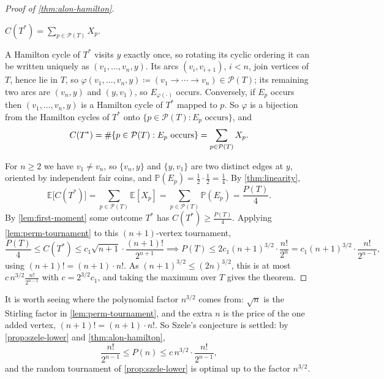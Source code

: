\begin{proof}[Proof of \autoref{thm:alon-hamilton}]
    \begin{claim}
        \(C(T^*) = \sum_{p \in \mathcal{P}(T)} X_p\).
    \end{claim}
    \begin{subproof}
        A Hamilton cycle of \(T^*\) visits \(y\) exactly once, so rotating its cyclic ordering it can be written uniquely as \((v_1, \ldots, v_n, y)\). Its arcs \((v_i, v_{i+1})\), \(i < n\), join vertices of \(T\), hence lie in \(T\), so \(\varphi(v_1, \ldots, v_n, y) \coloneqq (v_1 \to \cdots \to v_n) \in \mathcal{P}(T)\); its remaining two arcs are \((v_n, y)\) and \((y, v_1)\), so \(E_{\varphi(\cdot)}\) occurs. Conversely, if \(E_p\) occurs then \((v_1, \ldots, v_n, y)\) is a Hamilton cycle of \(T^*\) mapped to \(p\). So \(\varphi\) is a bijection from the Hamilton cycles of \(T^*\) onto \(\{ p \in \mathcal{P}(T) : E_p \text{ occurs} \}\), and
        \[
            C(T^*) = \#\{ p \in \mathcal{P}(T) : E_p \text{ occurs} \} = \sum_{p \in \mathcal{P}(T)} X_p. \qedhere
        \]
    \end{subproof}

    For \(n \ge 2\) we have \(v_1 \ne v_n\), so \(\{v_n, y\}\) and \(\{y, v_1\}\) are two distinct edges at \(y\), oriented by independent fair coins, and \(\mathbb{P}(E_p) = \frac{1}{2} \cdot \frac{1}{2} = \frac{1}{4}\). By \autoref{thm:linearity},
    \[
        \mathbb{E}\bigl[ C(T^*) \bigr] = \sum_{p \in \mathcal{P}(T)} \mathbb{E}[X_p] = \sum_{p \in \mathcal{P}(T)} \mathbb{P}(E_p) = \frac{P(T)}{4}.
    \]
    By \autoref{lem:first-moment} some outcome \(T^*\) has \(C(T^*) \ge \frac{P(T)}{4}\). Applying \autoref{lem:perm-tournament} to this \((n+1)\)-vertex tournament,
    \[
        \frac{P(T)}{4} \le C(T^*) \le c_1 \sqrt{n+1} \cdot \frac{(n+1)!}{2^{n+1}}
        \implies P(T) \le 2 c_1 (n+1)^{3/2} \cdot \frac{n!}{2^{n}} = c_1 (n+1)^{3/2} \cdot \frac{n!}{2^{n-1}},
    \]
    using \((n+1)! = (n+1) \cdot n!\). As \((n+1)^{3/2} \le (2n)^{3/2}\), this is at most \(c \, n^{3/2} \frac{n!}{2^{n-1}}\) with \(c = 2^{3/2} c_1\), and taking the maximum over \(T\) gives the theorem.
\end{proof}

\begin{remark}
    It is worth seeing where the polynomial factor \(n^{3/2}\) comes from: \(\sqrt{n}\) is the Stirling factor in \autoref{lem:perm-tournament}, and the extra \(n\) is the price of the one added vertex, \((n+1)! = (n+1) \cdot n!\). So Szele's conjecture is settled: by \autoref{prop:szele-lower} and \autoref{thm:alon-hamilton},
    \[
        \frac{n!}{2^{n-1}} \le P(n) \le c \, n^{3/2} \cdot \frac{n!}{2^{n-1}},
    \]
    and the random tournament of \autoref{prop:szele-lower} is optimal up to the factor \(n^{3/2}\).
\end{remark}


